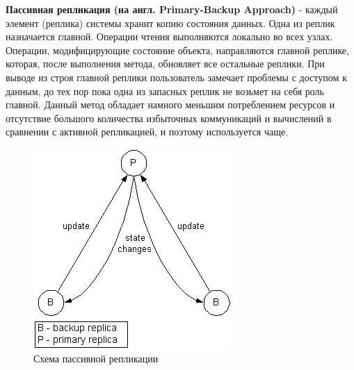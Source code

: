 \textbf{Пассивная репликация (на англ. Primary-Backup Approach)} - каждый элемент (реплика) системы хранит копию состояния данных. Одна из реплик назначается главной. Операции чтения выполняются локально во всех узлах. Операции, модифицирующие состояние объекта, направляются главной реплике, которая, после выполнения метода, обновляет все остальные реплики. При выводе из строя главной реплики пользователь замечает проблемы с доступом к данным, до тех пор пока одна из запасных реплик не возьмет на себя роль главной. Данный метод обладает намного меньшим потреблением ресурсов и отсутствие большого количества избыточных коммуникаций и вычислений в сравнении с активной репликацией, и поэтому используется чаще.
\begin{figure}[H]
	\centering
	\includegraphics[scale = 0.7]{24/passive.png}
	\caption{Схема пассивной репликации}
	\label{fig:passive_repl}
\end{figure}



	
